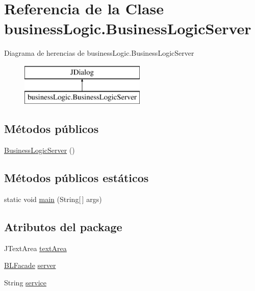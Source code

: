 \hypertarget{classbusinessLogic_1_1BusinessLogicServer}{}\section{Referencia de la Clase business\+Logic.\+Business\+Logic\+Server}
\label{classbusinessLogic_1_1BusinessLogicServer}
Diagrama de herencias de business\+Logic.\+Business\+Logic\+Server\begin{figure}[H]
\begin{center}
\leavevmode
\includegraphics[height=2.000000cm]{classbusinessLogic_1_1BusinessLogicServer}
\end{center}
\end{figure}
\subsection*{Métodos públicos}
\begin{DoxyCompactItemize}
\item 
\mbox{\hyperlink{classbusinessLogic_1_1BusinessLogicServer_a45e022d6b8b68567423caab4157e2784}{Business\+Logic\+Server}} ()
\end{DoxyCompactItemize}
\subsection*{Métodos públicos estáticos}
\begin{DoxyCompactItemize}
\item 
static void \mbox{\hyperlink{classbusinessLogic_1_1BusinessLogicServer_a978c1596ce77baed488f137fc96a4fe8}{main}} (String\mbox{[}$\,$\mbox{]} args)
\end{DoxyCompactItemize}
\subsection*{Atributos del \textquotesingle{}package\textquotesingle{}}
\begin{DoxyCompactItemize}
\item 
J\+Text\+Area \mbox{\hyperlink{classbusinessLogic_1_1BusinessLogicServer_aec137250843e53f480cd28952ca4afd7}{text\+Area}}
\item 
\mbox{\hyperlink{interfacebusinessLogic_1_1BLFacade}{B\+L\+Facade}} \mbox{\hyperlink{classbusinessLogic_1_1BusinessLogicServer_a4bc852beb0c0d3ba3f9115173594bd9e}{server}}
\item 
String \mbox{\hyperlink{classbusinessLogic_1_1BusinessLogicServer_a474037df64d451baf01fcb6f582cde2a}{service}}
\end{DoxyCompactItemize}
